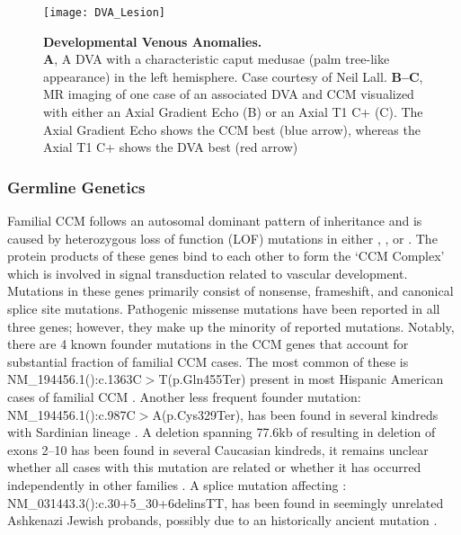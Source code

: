 \begin{figure}[tbp!]
\begin{center}
\texttt{[image: DVA\_Lesion]}
\end{center}
\caption[Developmental Venous Anomalies.] {\textbf{Developmental Venous Anomalies.} \\ \textbf{A},  A DVA with a characteristic caput medusae (palm tree-like appearance) in the left hemisphere. Case courtesy of Neil Lall. \textbf{B--C}, MR imaging of one case of an associated DVA and CCM visualized with either an Axial Gradient Echo (B) or an Axial T1 C+ (C). The Axial Gradient Echo shows the CCM best (blue arrow), whereas the Axial T1 C+ shows the DVA best (red arrow)}

\label{DVA_Lesion}
\end{figure}

\subsubsection{Germline Genetics}
Familial CCM follows an autosomal dominant pattern of inheritance \citep{bicknell1978, clark1970, kidd1947} and is caused by heterozygous loss of function (LOF) mutations in either  \citep{labergelecouteulx1999, sahoo1999},  \citep{liquori2003, denier2004}, or  \citep{bergametti2005}. The protein products of these genes bind to each other to form the `CCM Complex' which is involved in signal transduction related to vascular development. Mutations in these genes primarily consist of nonsense, frameshift, and canonical splice site mutations. Pathogenic missense mutations have been reported in all three genes; however, they make up the minority of reported mutations. Notably, there are 4 known founder mutations in the CCM genes that account for substantial fraction of familial CCM cases. The most common of these is NM\_194456.1():c.1363C$>$T(p.Gln455Ter) present in most Hispanic American cases of familial CCM \citep{gunel1996, sahoo1999}. Another less frequent  founder mutation: NM\_194456.1():c.987C$>$A(p.Cys329Ter), has been found in several kindreds with Sardinian lineage \citep{cau2009}. A deletion spanning 77.6kb of  resulting in deletion of exons 2--10 has been found in several Caucasian kindreds, it remains unclear whether all cases with this mutation are related or whether it has occurred independently in other families \citep{liquori2007}. A splice mutation affecting : NM\_031443.3():c.30+5\_30+6delinsTT, has been found in seemingly unrelated Ashkenazi Jewish probands, possibly due to an historically ancient mutation \citep{gallione2011}.

